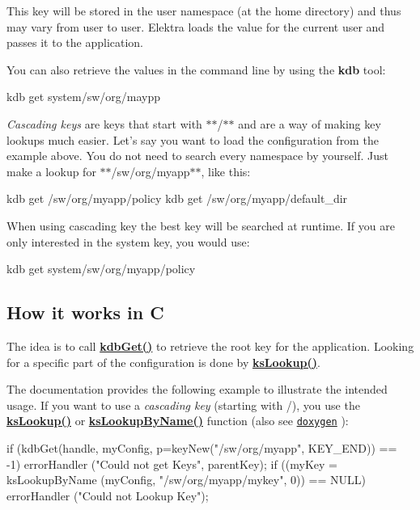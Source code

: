 This key will be stored in the user namespace (at the home directory) and thus may vary from user to user. Elektra loads the value for the current user and passes it to the application.

You can also retrieve the values in the command line by using the {\bfseries kdb} tool\+: \begin{DoxyVerb}    kdb get system/sw/org/maypp
\end{DoxyVerb}


{\itshape Cascading keys} are keys that start with $\ast$$\ast$/$\ast$$\ast$ and are a way of making key lookups much easier. Let's say you want to load the configuration from the example above. You do not need to search every namespace by yourself. Just make a lookup for $\ast$$\ast$/sw/org/myapp$\ast$$\ast$, like this\+: \begin{DoxyVerb}    kdb get /sw/org/myapp/policy
    kdb get /sw/org/myapp/default_dir
\end{DoxyVerb}


When using cascading key the best key will be searched at runtime. If you are only interested in the system key, you would use\+: \begin{DoxyVerb}    kdb get system/sw/org/myapp/policy
\end{DoxyVerb}


\subsection*{How it works in C}

The idea is to call {\bfseries \hyperlink{group__kdb_ga28e385fd9cb7ccfe0b2f1ed2f62453a1}{kdb\+Get()}} to retrieve the root key for the application. Looking for a specific part of the configuration is done by {\bfseries \hyperlink{group__keyset_gaa34fc43a081e6b01e4120daa6c112004}{ks\+Lookup()}}.

The documentation provides the following example to illustrate the intended usage. If you want to use a {\itshape cascading key} (starting with /), you use the {\bfseries \hyperlink{group__keyset_gaa34fc43a081e6b01e4120daa6c112004}{ks\+Lookup()}} or {\bfseries \hyperlink{group__keyset_gad2e30fb6d4739d917c5abb2ac2f9c1a1}{ks\+Lookup\+By\+Name()}} function (also see \href{http://doc.libelektra.org/api/current/html/group__keyset.html#gaa34fc43a081e6b01e4120daa6c112004}{\tt doxygen} )\+: \begin{DoxyVerb}    if (kdbGet(handle, myConfig,  p=keyNew("/sw/org/myapp", KEY_END)) == -1)
            errorHandler ("Could not get Keys", parentKey);
    if ((myKey = ksLookupByName (myConfig, "/sw/org/myapp/mykey", 0)) == NULL)
            errorHandler ("Could not Lookup Key");\end{DoxyVerb}
 